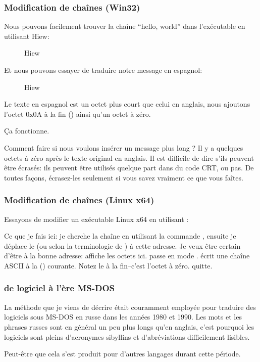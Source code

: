 ﻿\subsubsection{Modification de chaînes (Win32)}

Nous pouvons facilement trouver la chaîne ``hello, world'' dans l'exécutable en utilisant Hiew:

\begin{figure}[H]
\centering
{}
\caption{Hiew}
\label{}
\end{figure}

Et nous pouvons essayer de traduire notre message en espagnol:

\begin{figure}[H]
\centering
{}
\caption{Hiew}
\label{}
\end{figure}

Le texte en espagnol est un octet plus court que celui en anglais, nous ajoutons l'octet 0x0A à la fin
 () ainsi qu'un octet à zéro.

Ça fonctionne.

Comment faire si nous voulons insérer un message plus long ?
Il y a quelques octets à zéro après le texte original en anglais.
Il est difficile de dire s’ils peuvent être écrasés: ils peuvent être utilisés quelque part dans du code \ac{CRT},
ou pas.
De toutes façons, écrasez-les seulement si vous savez vraiment ce que vous faîtes.

\subsubsection{Modification de chaînes (Linux x64)}

\myindex{\radare}
Essayons de modifier un exécutable Linux x64 en utilisant \radare{}:



Ce que je fais ici: je cherche la chaîne  en utilisant la commande  \TT{/},
ensuite je déplace le  (ou  selon la terminologie de \radare{}) à cette adresse.
Je veux être certain d'être à la bonne adresse:  affiche les octets ici.
 passe \radare{} en mode .
 écrit une chaîne ASCII à la  () courante.
Notez le  à la fin--c'est l'octet à zéro.
 quitte.

\subsubsection{ de logiciel à l'ère MS-DOS}

La méthode que je viens de décrire était couramment employée pour traduire des logiciels sous MS-DOS en russe dans les
années 1980 et 1990.
Les mots et les phrases russes sont en général un peu plus longs qu'en anglais, c'est pourquoi les logiciels
 sont pleins d'acronymes sibyllins et d'abréviations difficilement lisibles.

Peut-être que cela s'est produit pour d'autres langages durant cette période.

